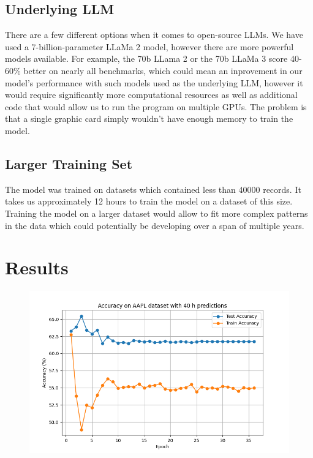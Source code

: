 \subsection{Underlying LLM}
There are a few different options when it comes to open-source LLMs. We have used a 7-billion-parameter LLaMa 2 model, however there are more powerful models available. For example, the 70b LLama 2 or the 70b LLaMa 3 score 40-60\% better on nearly all benchmarks, which could mean an inprovement in our model's performance with such models used as the underlying LLM, however it would require significantly more computational resources as well as additional code that would allow us to run the program on multiple GPUs. The problem is that a single graphic card simply wouldn't have enough memory to train the model.

\subsection{Larger Training Set}
The model was trained on datasets which contained less than 40000 records. It takes us approximately 12 hours to train the model on a dataset of this size. Training the model on a larger dataset would allow to fit more complex patterns in the data which could potentially be developing over a span of multiple years.

\section{Results}

\begin{figure}[h!]
	\centering
	\includegraphics[width=\linewidth]{"pictures/aapl_40h_results.png"}
	\caption{}
	\label{fig:aapl_fig}
\end{figure}

